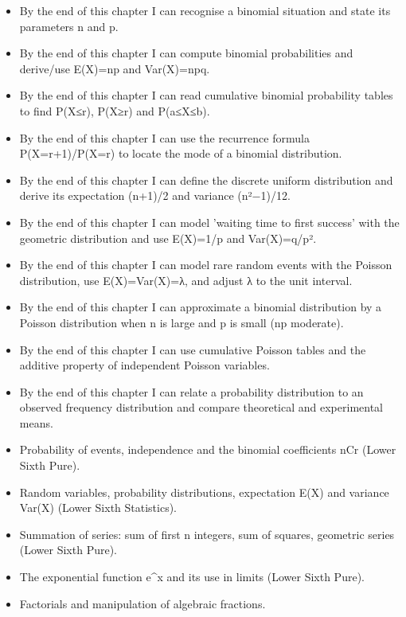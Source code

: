 \documentclass[11pt]{article}
\begin{document}
\begin{objectifs}
\begin{itemize}
\item By the end of this chapter I can recognise a binomial situation and state its parameters n and p.
\item By the end of this chapter I can compute binomial probabilities and derive/use E(X)=np and Var(X)=npq.
\item By the end of this chapter I can read cumulative binomial probability tables to find P(X≤r), P(X≥r) and P(a≤X≤b).
\item By the end of this chapter I can use the recurrence formula P(X=r+1)/P(X=r) to locate the mode of a binomial distribution.
\item By the end of this chapter I can define the discrete uniform distribution and derive its expectation (n+1)/2 and variance (n²−1)/12.
\item By the end of this chapter I can model 'waiting time to first success' with the geometric distribution and use E(X)=1/p and Var(X)=q/p².
\item By the end of this chapter I can model rare random events with the Poisson distribution, use E(X)=Var(X)=λ, and adjust λ to the unit interval.
\item By the end of this chapter I can approximate a binomial distribution by a Poisson distribution when n is large and p is small (np moderate).
\item By the end of this chapter I can use cumulative Poisson tables and the additive property of independent Poisson variables.
\item By the end of this chapter I can relate a probability distribution to an observed frequency distribution and compare theoretical and experimental means.
\end{itemize}
\end{objectifs}

\begin{prerequis}
\begin{itemize}
\item Probability of events, independence and the binomial coefficients nCr (Lower Sixth Pure).
\item Random variables, probability distributions, expectation E(X) and variance Var(X) (Lower Sixth Statistics).
\item Summation of series: sum of first n integers, sum of squares, geometric series (Lower Sixth Pure).
\item The exponential function e\^{}x and its use in limits (Lower Sixth Pure).
\item Factorials and manipulation of algebraic fractions.
\end{itemize}
\end{prerequis}
\end{document}
